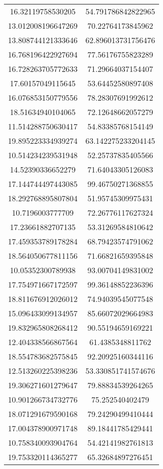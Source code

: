 \begin{table}
\begin{tabular}{cc}
16.32119758530205 & 54.791786842822965 \\
13.012008196647269 & 70.22764173845962 \\
13.808744121333646 & 62.896013731756476 \\
16.768196422927694 & 77.56176755823289 \\
16.728263705772633 & 71.29664037154407 \\
17.60157049115645 & 53.64452580897408 \\
16.076853150779556 & 78.28307691992612 \\
18.51634940104065 & 72.12648662057279 \\
11.514288750630417 & 54.83385768154149 \\
19.895223334939274 & 63.142275233204145 \\
10.514234239531948 & 52.25737835405566 \\
14.52390336652279 & 71.64043305126083 \\
17.144744497443085 & 99.46750271368855 \\
18.292768895807804 & 51.95745309975431 \\
10.7196003777709 & 72.26776117627324 \\
17.23661882707135 & 53.31269584810642 \\
17.459353789178284 & 68.79423574791062 \\
18.564050677811156 & 71.66821659395848 \\
10.05352300789938 & 93.00704149831002 \\
17.754971667172597 & 99.36148852236396 \\
18.811676912026012 & 74.94039545077548 \\
15.096433099134957 & 85.66072029664983 \\
19.832965808268412 & 90.55194659169221 \\
12.404338566867564 & 61.4385348811762 \\
18.554783682575845 & 92.20925160344116 \\
12.513260225398236 & 53.330851741574676 \\
19.306271601279647 & 79.88834539264265 \\
10.901266734732776 & 75.252540402479 \\
18.071291679590168 & 79.24290499410444 \\
17.004378900971748 & 89.18441785429441 \\
10.758340093904764 & 54.42141982761813 \\
19.753320114365277 & 65.32684897276451 \\

\end{tabular}
\end{table}

